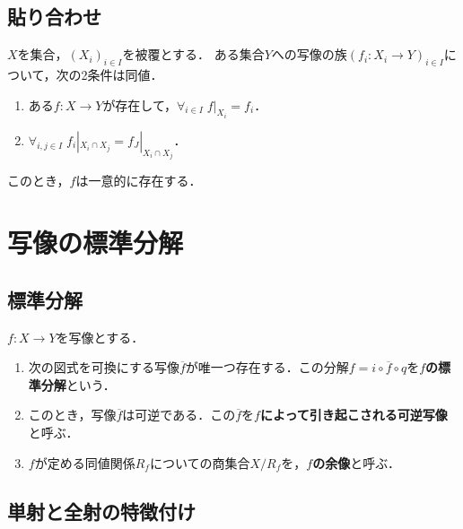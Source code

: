 \documentclass[uplatex,dvipdfmx]{jsreport}
\begin{document}
\subsection{貼り合わせ}

\begin{theorem}
    $X$を集合，$(X_i)_{i\in I}$を被覆とする．
    ある集合$Y$への写像の族$(f_i:X_i\to Y)_{i\in I}$について，次の2条件は同値．
    \begin{enumerate}
        \item ある$f:X\to Y$が存在して，$\forall_{i\in I}\;f|_{X_i}=f_i$．
        \item $\forall_{i,j\in I}\;f_i|_{X_i\cap X_j}=f_J|_{X_i\cap X_j}$．
    \end{enumerate}
    このとき，$f$は一意的に存在する．
\end{theorem}

\section{写像の標準分解}

\subsection{標準分解}

\begin{proposition}
    $f:X\to Y$を写像とする．
    \begin{enumerate}
        \item 次の図式を可換にする写像$\overline{f}$が唯一つ存在する．この分解$f=i\circ\overline{f}\circ q$を\textbf{$f$の標準分解}という．\begin{center}\end{center}
        \item このとき，写像$\overline{f}$は可逆である．この$\overline{f}$を\textbf{$f$によって引き起こされる可逆写像}と呼ぶ．
        \item $f$が定める同値関係$R_f$についての商集合$X/R_f$を，\textbf{$f$の余像}と呼ぶ．
    \end{enumerate}
\end{proposition}

\subsection{単射と全射の特徴付け}
\end{document}
